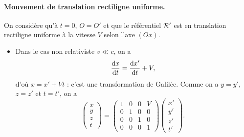             \paragraph{Mouvement de translation rectiligne uniforme.} On considère qu'à $t=0$, $O=O'$ et que le référentiel $\mathcal{R}'$ est en translation rectiligne uniforme à la vitesse $V$ selon l'axe $(Ox)$. \begin{itemize}
                \item Dans le cas non relativiste $v\ll c$, on a 
                \begin{equation}
                    \frac{\mathrm{d} x}{\mathrm{d} t}=\frac{\mathrm{d} x'}{\mathrm{d} t}+V,
                \end{equation}
                d'où $x=x'+Vt$ : c'est une transformation de Galilée. Comme on a $y=y'$, $z=z'$ et $t=t'$, on a 
                \begin{equation}
                    \begin{pmatrix}
                        x\\y\\z\\t
                    \end{pmatrix}=\begin{pmatrix}
                        1&0&0&V\\0&1&0&0\\0&0&1&0\\0&0&0&1
                    \end{pmatrix}\begin{pmatrix}
                        x'\\y'\\z'\\t'
                    \end{pmatrix}.
                \end{equation}


\end{itemize}
